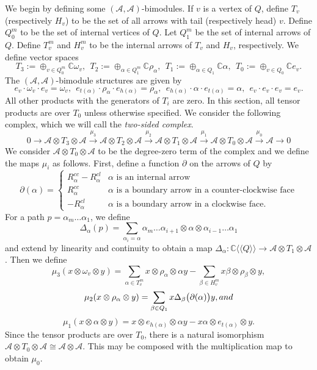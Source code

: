 \documentclass{article}
\theoremstyle{definition}
\newcommand{\A}{{\mathcal A}}
\begin{document}
We begin by defining some $(\A,\A)$-bimodules. If $v$ is a vertex of $Q$, define $T_v$ (respectively $H_v$) to be the set of all arrows with tail (respectively head) $v$. Define $Q_0^m$ 
to be the set of internal 
vertices of $Q$.  Let $Q_1^m$ 
be the set of internal 
arrows of $Q$.
Define $T_v^m$ and $H_v^m$ to be the internal arrows of $T_v$ and $H_v$, respectively.
We define vector spaces
\[ T_3:=\oplus_{v\in Q_0^m}\mathbb C\omega_v,\ \  
T_2:=\oplus_{\alpha\in Q_1^m}\mathbb C\rho_\alpha,\ \ 
T_1:=\oplus_{\alpha\in Q_1}\mathbb C\alpha,\ \ 
T_0:=\oplus_{v\in Q_0}\mathbb C e_v.\]
The $(\A,\A)$-bimodule structures are given by
\[e_v\cdot\omega_v\cdot e_v=\omega_v,\ \ e_{t(\alpha)}\cdot\rho_\alpha\cdot e_{h(\alpha)}=\rho_\alpha,\ \ 
e_{h(\alpha)}\cdot\alpha\cdot e_{t(\alpha)}=\alpha,\ \ e_v\cdot e_v\cdot e_v=e_v.\]
All other products with the generators of $T_i$ are zero.
In this section, all tensor products are over $T_0$ unless otherwise specified. We consider the following complex, which we will call the \textit{two-sided complex}.
\begin{equation}\label{eqn:cmp2}0\to \A\otimes T_3\otimes \A\xrightarrow{\mu_3}\A\otimes T_2\otimes \A\xrightarrow{\mu_2}\A\otimes T_1\otimes \A\xrightarrow{\mu_1}\A\otimes T_0\otimes \A\xrightarrow{\mu_0}\A\to0\end{equation}
	We consider $\A\otimes T_0\otimes \A$ to be the degree-zero term of the complex and
we define the maps $\mu_i$ as follows.
First, define a function $\partial$ on the arrows of $Q$ by
\[\partial(\alpha)=\begin{cases}R_\alpha^{cc}-R_\alpha^{cl}&\alpha\text{ is an internal arrow}\\
	R_\alpha^{cc}&\alpha\text{ is a boundary arrow in a counter-clockwise face}\\
-R_\alpha^{cl}&\alpha\text{ is a boundary arrow in a clockwise face}.\end{cases}\]
For a path $p=\alpha_m\dots\alpha_1$, we define 
\[\Delta_\alpha(p)=\sum_{\alpha_i=\alpha}\alpha_m\dots\alpha_{i+1}\otimes\alpha\otimes\alpha_{i-1}\dots\alpha_1\]
and extend by linearity and continuity to obtain a map $\Delta_\alpha:\mathbb C\langle\langle Q\rangle\rangle\to \A\otimes T_1\otimes \A$. Then we define
\[\mu_3(x\otimes\omega_v\otimes y)=\sum_{\alpha\in T_v^{m}}x\otimes\rho_\alpha\otimes \alpha y-\sum_{\beta\in H_v^{m}}x\beta\otimes\rho_\beta\otimes y,\]
\[\mu_2(x\otimes\rho_\alpha\otimes y)=\sum_{\beta\in Q_1}x\Delta_\beta\big(\partial(\alpha)\big)y,\textup{ and }\]
\[\mu_1(x\otimes\alpha\otimes y)=x\otimes e_{h(\alpha)}\otimes\alpha y-x\alpha\otimes e_{t(\alpha)}\otimes y.\]
Since the tensor products are over $T_0$, there is a natural isomorphism $\A\otimes T_0\otimes \A\cong \A\otimes \A$. This may be composed with the multiplication map to obtain $\mu_0$.
\end{document}
